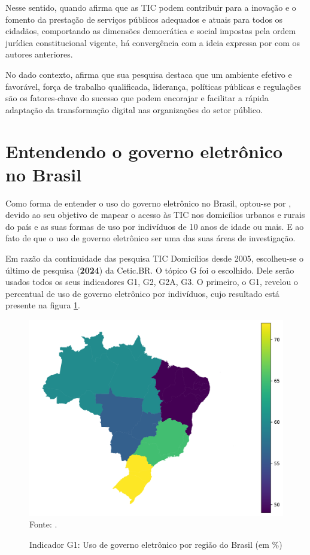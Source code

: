 Nesse sentido, quando \cite{cristovam2020governo} afirma que as TIC podem contribuir para a inovação e o fomento da prestação de serviços públicos adequados e atuais para todos os cidadãos, comportando as dimensões democrática e social impostas pela ordem jurídica constitucional vigente, há convergência com a ideia expressa por \cite{kotenok2020government} com os autores anteriores.

No dado contexto, \cite{alenezi2022understanding} afirma que sua pesquisa destaca que um ambiente efetivo e favorável, força de trabalho qualificada, liderança, políticas públicas e regulações são os fatores-chave do sucesso que podem encorajar e facilitar a rápida adaptação da transformação digital nas organizações do setor público.

\section{Entendendo o governo eletrônico no Brasil}
	
Como forma de entender o uso do governo eletrônico no Brasil, optou-se por \cite{tic_domicilios_2024}, devido ao seu objetivo de mapear o acesso às TIC nos domicílios urbanos e rurais do país e as suas formas de uso por indivíduos de 10 anos de idade ou mais. E ao fato de que o uso de governo eletrônico ser uma das suas áreas de investigação.

Em razão da continuidade das pesquisa TIC Domicílios desde 2005, escolheu-se o último de pesquisa (\textbf{2024}) da Cetic.BR. O tópico G foi o escolhido. Dele serão usados todos os seus indicadores G1, G2, G2A, G3. O primeiro, o G1, revelou o percentual de uso de governo eletrônico por indivíduos, cujo resultado está presente na figura \ref{fig:mapa_coropletico_tic_domicilio_g1}.

\begin{figure}[H]
	\centering
	\caption{Indicador G1: Uso de governo eletrônico por região do Brasil (em \%)}
	\includegraphics[width=1\linewidth]{figuras/mapa_coropletico_tic_domicilios_2024_g1}
	\label{fig:mapa_coropletico_tic_domicilio_g1}
	\footnotesize{Fonte: \cite{tic_domicilios_2024_g1}.}
\end{figure}

